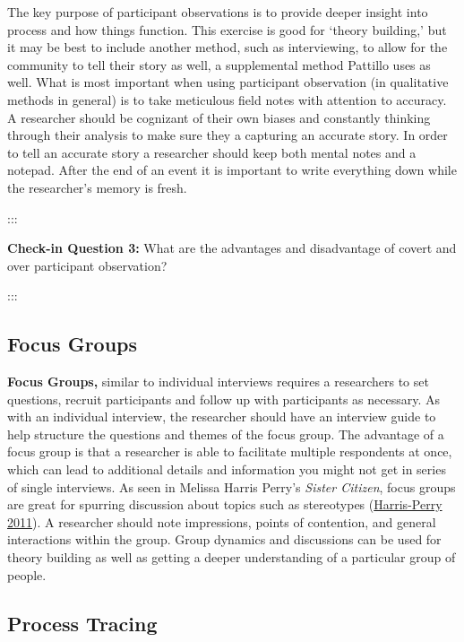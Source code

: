 \documentclass{book}
\begin{document}
The key purpose of participant observations is to provide deeper insight into
process and how things function. This exercise is good for `theory building,'
but it may be best to include another method, such as interviewing, to allow
for the community to tell their story as well, a supplemental method Pattillo
uses as well. What is most important when using participant observation (in
qualitative methods in general) is to take meticulous field notes with
attention to accuracy. A researcher should be cognizant of their own biases
and constantly thinking through their analysis to make sure they a capturing
an accurate story. In order to tell an accurate story a researcher should keep
both mental notes and a notepad. After the end of an event it is important to
write everything down while the researcher's memory is fresh.

:::

\textbf{Check-in Question 3:} What are the advantages and disadvantage of
covert and over participant observation?

:::

\hypertarget{focus-groups}{%
\subsection{Focus Groups}\label{focus-groups}}

\textbf{Focus Groups,} similar to individual interviews requires a researchers
to set questions, recruit participants and follow up with participants as
necessary. As with an individual interview, the researcher should have an
interview guide to help structure the questions and themes of the focus group.
The advantage of a focus group is that a researcher is able to facilitate
multiple respondents at once, which can lead to additional details and
information you might not get in series of single interviews. As seen in
Melissa Harris Perry's \emph{Sister Citizen}, focus groups are great for
spurring discussion about topics such as stereotypes
(\protect\hyperlink{ref-harris-perry2011a}{Harris-Perry 2011}). A researcher
should note impressions, points of contention, and general interactions within
the group. Group dynamics and discussions can be used for theory building as
well as getting a deeper understanding of a particular group of people.

\hypertarget{process-tracing}{%
\subsection{Process Tracing}\label{process-tracing}}
\end{document}
